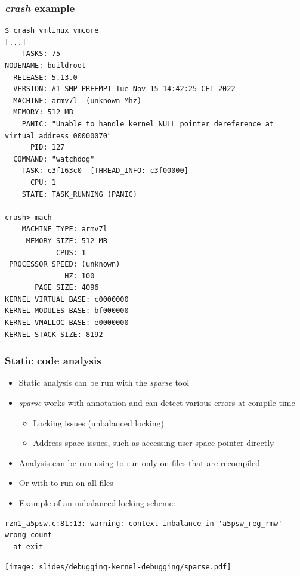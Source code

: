 \begin{frame}[fragile]
  \frametitle{{\em crash} example}
  \begin{itemize}
    \begin{block}{}
      \begin{verbatim}
$ crash vmlinux vmcore
[...]
    TASKS: 75
NODENAME: buildroot
  RELEASE: 5.13.0
  VERSION: #1 SMP PREEMPT Tue Nov 15 14:42:25 CET 2022
  MACHINE: armv7l  (unknown Mhz)
  MEMORY: 512 MB
    PANIC: "Unable to handle kernel NULL pointer dereference at virtual address 00000070"
      PID: 127
  COMMAND: "watchdog"
    TASK: c3f163c0  [THREAD_INFO: c3f00000]
      CPU: 1
    STATE: TASK_RUNNING (PANIC)

crash> mach
    MACHINE TYPE: armv7l
     MEMORY SIZE: 512 MB
            CPUS: 1
 PROCESSOR SPEED: (unknown)
              HZ: 100
       PAGE SIZE: 4096
KERNEL VIRTUAL BASE: c0000000
KERNEL MODULES BASE: bf000000
KERNEL VMALLOC BASE: e0000000
KERNEL STACK SIZE: 8192
      \end{verbatim}
    \end{block}
  \end{itemize}
\end{frame}



\begin{frame}[fragile]
  \frametitle{Static code analysis}
  \begin{itemize}
    \item Static analysis can be run with the {\em sparse} tool
    \item {\em sparse} works with annotation and can detect various errors at
          compile time
    \begin{itemize}
      \item Locking issues (unbalanced locking)
      \item Address space issues, such as accessing user space pointer directly
    \end{itemize}
    \item Analysis can be run using  to run only on files that are
          recompiled
    \item Or with  to run on all files
    \item Example of an unbalanced locking scheme:
  \end{itemize}
  \begin{block}{}
    \begin{verbatim}
rzn1_a5psw.c:81:13: warning: context imbalance in 'a5psw_reg_rmw' - wrong count
  at exit
    \end{verbatim}
  \end{block}

  \vspace{0.5cm}
  \begin{center}
    \texttt{[image: slides/debugging-kernel-debugging/sparse.pdf]}
  \end{center}
\end{frame}

